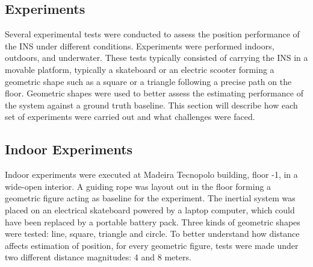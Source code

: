 \newpage




\subsection{Experiments}
\label{sub:experiments}

Several experimental tests were conducted to assess the position performance of the INS under different conditions. Experiments were performed indoors, outdoors, and underwater. These tests typically consisted of carrying the INS in a movable platform, typically a skateboard or an electric scooter forming a geometric shape such as a square or a triangle following a precise path on the floor. Geometric shapes were used to better assess the estimating performance of the system against a ground truth baseline. This section will describe how each set of experiments were carried out and what challenges were faced.

\subsection{Indoor Experiments}

Indoor experiments were executed at Madeira Tecnopolo building, floor -1, in a wide-open interior. A guiding rope was layout out in the floor forming a geometric figure acting as baseline for the experiment. The inertial system was placed on an electrical skateboard powered by a laptop computer, which could have been replaced by a portable battery pack. Three kinds of geometric shapes were tested: line, square, triangle and circle. To better understand how distance affects estimation of position, for every geometric figure, tests were made under two different distance magnitudes: 4 and 8 meters.

